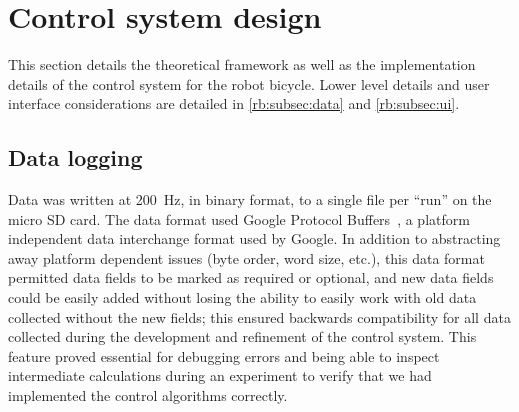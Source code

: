 \section{Control system design} \label{rb:sec:control}
This section details the theoretical framework as well as the implementation
details of the control system for the robot bicycle. Lower level details and
user interface considerations are detailed in \autoref{rb:subsec:data} and
\autoref{rb:subsec:ui}.

\subsection{Data logging} \label{rb:subsec:data}
Data was written at \SI{200}{\Hz}, in binary format, to a single file per ``run'' on
the micro SD card. The data format used Google Protocol
Buffers~\cite{GoogleProtoBuf}, a platform independent data interchange format
used by Google. In addition to abstracting away platform dependent issues (byte
order, word size, etc.), this data format permitted data fields to be marked as
required or optional, and new data fields could be easily added without losing
the ability to easily work with old data collected without the new fields; this
ensured backwards compatibility for all data collected during the development
and refinement of the control system. This feature proved essential for
debugging errors and being able to inspect intermediate calculations during an
experiment to verify that we had implemented the control algorithms correctly.


